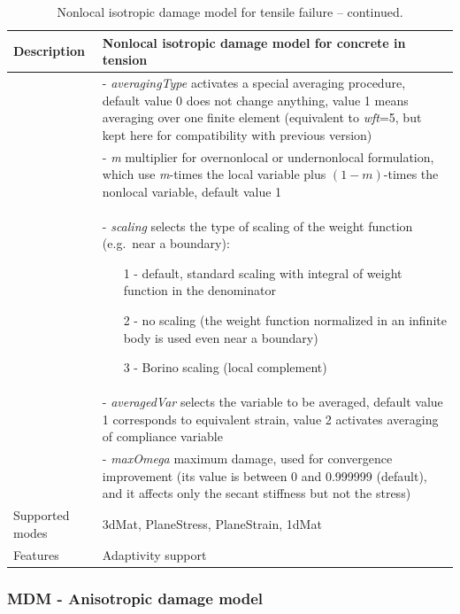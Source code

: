 \documentclass[a4paper]{article}
\newcommand{\param}[1]{{\it #1}}
\begin{document}
\begin{table}[!htb]
\begin{tabular}{|l|p{9cm}|}
\hline
Description & Nonlocal isotropic damage model for concrete in tension\\
\hline
&- \param{averagingType} activates a special averaging procedure, default value 0 does not change anything, value 1 means averaging over one finite element 
(equivalent to {\it wft}=5, but kept here for compatibility with previous version)\\
&- \param{m} multiplier for overnonlocal or undernonlocal formulation, which use
{\em m}-times the local variable plus $(1-m)$-times the nonlocal variable, default value 1\\
&- \param{scaling} selects the type of scaling of the weight function (e.g.\ near a boundary):
\begin{itemize}\setlength{\itemsep}{-3pt}
\item[1 -] default, standard scaling with integral of weight function in the denominator
\item[2 -] no scaling (the weight function normalized in an infinite body is used even near a boundary)
\item[3 -] Borino scaling (local complement)
\end{itemize}\\
&- \param{averagedVar} selects the variable to be averaged, default value 1 corresponds to equivalent strain, value 2 activates averaging of compliance variable\\
&- \param{maxOmega} maximum damage, used for convergence improvement
(its value is between 0 and 0.999999 (default), and it affects only the secant stiffness
but not the stress)\\
Supported modes& 3dMat, PlaneStress, PlaneStrain, 1dMat\\
Features & Adaptivity support\\
\hline
\end{tabular}
\caption{Nonlocal isotropic damage model for tensile failure -- continued.}
\label{idnl_table_cont}
\end{table}

\clearpage

\subsubsection{MDM - Anisotropic damage model}
\end{document}
